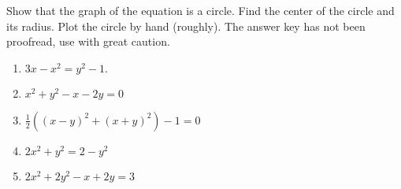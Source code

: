 Show that the graph of the equation is a circle. Find the center of the circle and its radius. Plot the circle by hand (roughly). The answer key has not been proofread, use with great caution.

\begin{enumerate}
\item 
$
3x-x^{2}= y^2-1.
$

\item 
$
x^2+y^2-x-2y=0
$

\item $\frac{1}{2}\left((x-y)^2 + (x+y)^2\right) -1=0   $

\item $ 2x^2+y^2=2-y^2   $

\item  \label{problemFindCenterAndRadius2x^2+2y^2-x+2y=3} $ 2x^2+2y^2-x+2y=3$

\end{enumerate}
